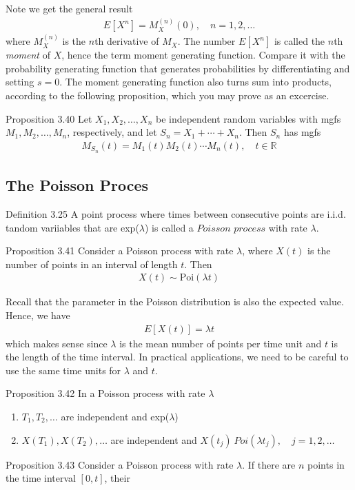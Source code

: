 Note we get the general result
\begin{align*}
  E[X^n] = M^{(n)}_X(0), \quad n = 1, 2, \ldots
\end{align*}
where $M_X^{(n)}$ is the $n$th derivative of $M_X$.
The number $E[X^n]$ is called the $n$th \textit{moment} of $X$, hence the term moment generating function. Compare it with the probability generating function that generates probabilities by differentiating and setting $s = 0$. The moment generating function also turns sum into products, according to the following proposition, which you may prove as an excercise.
\begin{boks}{Proposition 3.40}
  Let $X_1, X_2, \ldots, X_n$ be independent random variables with mgfs $M_1, M_2, \ldots, M_n$, respectively, and let $S_n = X_1 + \cdots + X_n$. Then $S_n$ has mgfs
  \begin{align*}
    M_{S_n}(t) = M_1(t)M_2(t)\cdots M_n(t), \quad t \in \mathbb{R}
  \end{align*}
\end{boks}

\subsection{The Poisson Proces}
\begin{boks}{Definition 3.25}
  A point process where times between consecutive points are i.i.d. tandom variiables that are exp($\lambda$) is called a $Poisson$ $process$ with rate $\lambda$.
\end{boks}

\begin{boks}{Proposition 3.41}
  Consider a Poisson process with rate $\lambda$, where $X(t)$ is the number of points in an interval of length $t$.
  Then
  \begin{align*}
    X(t) \sim \text{Poi}(\lambda t)
  \end{align*}
\end{boks}
Recall that the parameter in the Poisson distribution is also the expected value.
Hence, we have
\begin{align*}
  E[X(t)] = \lambda t
\end{align*}
which makes sense since $\lambda$ is the mean number of points per time unit and $t$ is the length of the time interval.
In practical applications, we need to be careful to use the same time units for $\lambda$ and $t$.
\begin{boks}{Proposition 3.42}
  In a Poisson process with rate $\lambda$
  \begin{enumerate}
    \item $T_1, T_2, \ldots$ are independent and exp($\lambda$)
    \item $X(T_1), X(T_2), \ldots$ are independent and $X(t_j) ~ Poi(\lambda t_j), \quad j = 1, 2, \ldots$
  \end{enumerate}
\end{boks}

\begin{boks}{Proposition 3.43}
  Consider a Poisson process with rate $\lambda$. If there are $n$ points in the time interval $[0,t]$, their
\end{boks}
